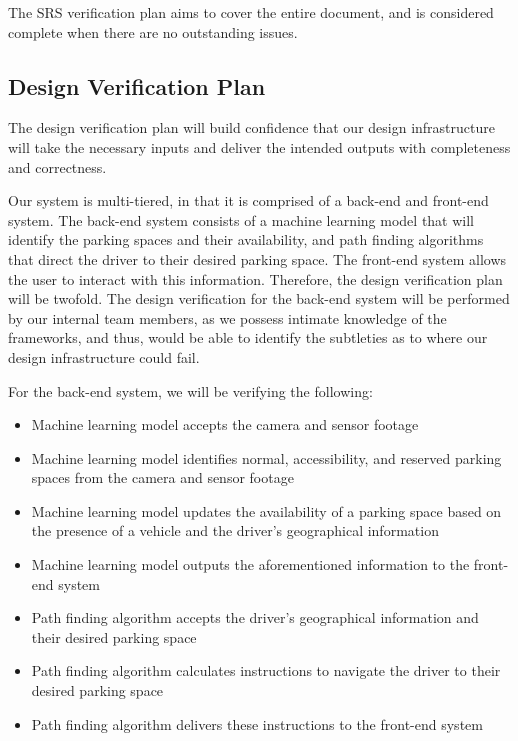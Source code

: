 \documentclass[12pt, titlepage]{article}
\begin{document}
The SRS verification plan aims to cover the entire document, and is considered
complete when there are no outstanding issues.




\subsection{Design Verification Plan}
\label{sec:design}
The design verification plan will build confidence that our design
infrastructure will take the necessary inputs and deliver the intended outputs
with completeness and correctness. 

Our system is multi-tiered, in that it is comprised of a back-end and front-end
system. The back-end system consists of a machine learning model that will
identify the parking spaces and their availability, and path finding algorithms
that direct the driver to their desired parking space. The front-end system
allows the user to interact with this information. Therefore, the design
verification plan will be twofold. The design verification for the back-end
system will be performed by our internal team members, as we possess intimate
knowledge of the frameworks, and thus, would be able to identify the subtleties
as to where our design infrastructure could fail. 

For the back-end system, we will be verifying the following:
\begin{itemize}
    \item Machine learning model accepts the camera and sensor footage
    \item Machine learning model identifies normal, accessibility, and reserved
    parking spaces from the camera and sensor footage
    \item Machine learning model updates the availability of a parking space
    based on the presence of a vehicle and the driver's geographical information
    \item Machine learning model outputs the aforementioned information to the
    front-end system
    \item Path finding algorithm accepts the driver's geographical information
    and their desired parking space
    \item Path finding algorithm calculates instructions to navigate the driver
    to their desired parking space
    \item Path finding algorithm delivers these instructions to the front-end
    system
\end{itemize}
\end{document}

